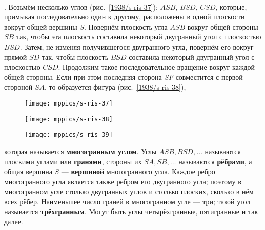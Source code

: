 \paragraph{}\label{1938/s49}
\mbox{.}
Возьмём несколько углов (рис.~\ref{1938/s-ris-37}): $ASB$, $BSD$, $CSD$, которые, примыкая последовательно один к другому, расположены в одной плоскости вокруг общей вершины $S$.
Повернём плоскость угла $ASB$ вокруг общей стороны $SB$ так, чтобы эта плоскость составила некоторый двугранный угол с плоскостью $BSD$.
Затем, не изменяя получившегося двугранного угла, повернём его вокруг прямой $SD$ так, чтобы плоскость $BSD$ составила некоторый двугранный угол с плоскостью $CSD$.
Продолжим такое последовательное вращение вокруг каждой общей стороны.
Если при этом последняя сторона $SF$ совместится с первой стороной $SA$, то образуется фигура (рис.~\ref{1938/s-ris-38}), 
\begin{figure}[!ht]
\begin{minipage}{.32\textwidth}
\centering
\texttt{[image: mppics/s-ris-37]}
\end{minipage}
\hfill
\begin{minipage}{.32\textwidth}
\centering
\texttt{[image: mppics/s-ris-38]}
\end{minipage}
\hfill
\begin{minipage}{.32\textwidth}
\centering
\texttt{[image: mppics/s-ris-39]}
\end{minipage}

\medskip

\begin{minipage}{.32\textwidth}
\centering
\caption{}\label{1938/s-ris-37}
\end{minipage}
\hfill
\begin{minipage}{.32\textwidth}
\centering
\caption{}\label{1938/s-ris-38}
\end{minipage}
\hfill
\begin{minipage}{.32\textwidth}
\centering
\caption{}\label{1938/s-ris-39}
\end{minipage}
\vskip-4mm
\end{figure}
которая называется \textbf{многогранным углом}.
Углы $ASB, BSD,\dots$ называются плоскими углами или \textbf{гранями}, стороны их $SA, SB,\dots$ называются \textbf{рёбрами}, а общая вершина $S$ — \textbf{вершиной} многогранного угла.
Каждое ребро многогранного угла является также ребром его двугранного угла;
поэтому в многогранном угле столько двугранных углов и столько плоских, сколько в нём всех рёбер.
Наименьшее число граней в многогранном угле — три;
такой угол называется \textbf{трёхгранным}.
Могут быть углы четырёхгранные, пятигранные и так далее.

